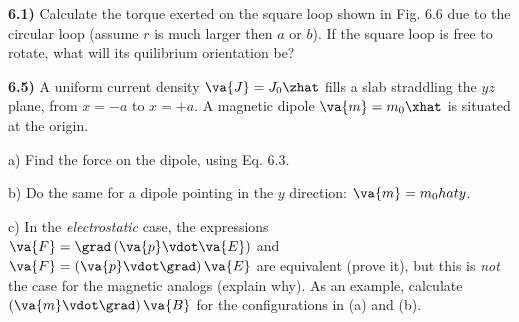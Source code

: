 \documentclass[12pt,a4paper]{article}
\newcommand{\prob}[2]{\textbf{#1)} #2}
\begin{document}
\prob{6.1}{Calculate the torque exerted on the square loop shown in Fig. 6.6 due to the circular loop (assume $r$ is much larger then $a$ or $b$). If the square loop is free to rotate, what will its quilibrium orientation be?}

\prob{6.5}{A uniform current density $\va{J} = J_0 \zhat$ fills a slab straddling the $yz$ plane, from $x = -a$ to $x = +a$.
A magnetic dipole $\va{m} = m_0 \xhat$ is situated at the origin.}

a) Find the force on the dipole, using Eq. 6.3.

b) Do the same for a dipole pointing in the $y$ direction: $\va{m} = m_0 \\hat{y}$.

c) In the \textit{electrostatic} case, the expressions $\va{F} = \grad \left( \va{p} \vdot \va{E} \right)$ and $\va{F} = \left( \va{p} \vdot \grad \right) \va{E}$ are equivalent (prove it), but this is \textit{not} the case for the magnetic analogs (explain why).
As an example, calculate $\left( \va{m} \vdot \grad \right) \va{B}$ for the configurations in (a) and (b).
\end{document}
